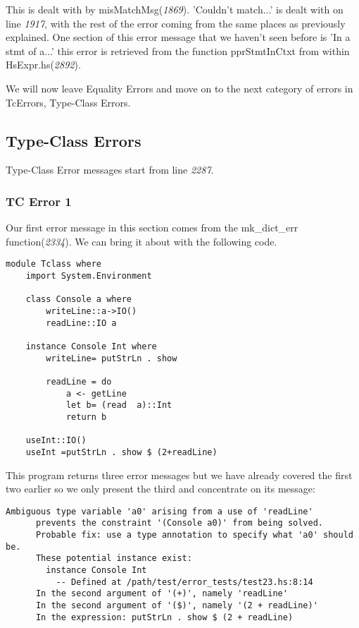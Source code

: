 \documentclass[a4paper]{article}
\begin{document}
This is dealt with by misMatchMsg(\textit{1869}). 'Couldn't match...' is dealt with on line \textit{1917}, with the rest of the error coming from the same places as previously explained. One section of this error message that we haven't seen before is 'In a stmt of a...' this error is retrieved from the function pprStmtInCtxt from within HsExpr.hs(\textit{2892}).

We will now leave Equality Errors and move on to the next category of errors in TcErrors, Type-Class Errors.

\subsection{Type-Class Errors}

Type-Class Error messages start from line \textit{2287}. 

\subsubsection{TC Error 1}

Our first error message in this section comes from the mk\_dict\_err function(\textit{2334}). We can bring it about with the following code. 

\begin{lstlisting}[label={lst: T15.0}, numbers=none, caption={Example Program \cite{ex15}}]
module Tclass where
    import System.Environment

    class Console a where
        writeLine::a->IO()
        readLine::IO a

    instance Console Int where
        writeLine= putStrLn . show 

        readLine = do
            a <- getLine
            let b= (read  a)::Int
            return b

    useInt::IO()
    useInt =putStrLn . show $ (2+readLine)
\end{lstlisting}

This program returns three error messages but we have already covered the first two earlier so we only present the third and concentrate on its message:

\begin{lstlisting}[label={lst: T15.0.2}, numbers=none, caption={Error}]
Ambiguous type variable 'a0' arising from a use of 'readLine'
      prevents the constraint '(Console a0)' from being solved.
      Probable fix: use a type annotation to specify what 'a0' should be.
      These potential instance exist:
        instance Console Int
          -- Defined at /path/test/error_tests/test23.hs:8:14
      In the second argument of '(+)', namely 'readLine'
      In the second argument of '($)', namely '(2 + readLine)'
      In the expression: putStrLn . show $ (2 + readLine)
\end{lstlisting}
\end{document}
